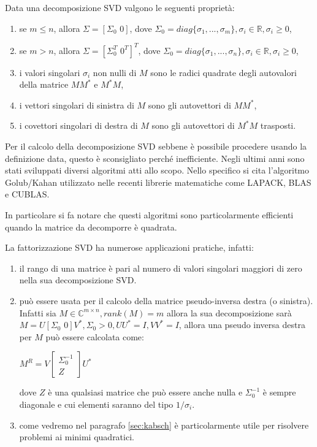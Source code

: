 \begin{prop}
	Data una decomposizione SVD valgono le seguenti proprietà:
	\begin{enumerate}
		\item se $ m \le n$, allora $\Sigma = [\Sigma_0 \, \, 0]$, dove $\Sigma_0 = diag \{\sigma_1, ..., \sigma_m \}, \sigma_i \in \mathbb{R}, \sigma_i \ge 0$,
		\item se $ m > n$, allora $\Sigma = [\Sigma_0^T \, \, 0^T]^T$, dove $\Sigma_0 = diag \{\sigma_1, ..., \sigma_n \}, \sigma_i \in \mathbb{R}, \sigma_i \ge 0$,	 
		\item i valori singolari $\sigma_i$ non nulli di $M$ sono le radici quadrate degli autovalori della matrice $MM^*$ e $M^*M$,
		\item i vettori singolari di sinistra di $M$ sono gli autovettori di $MM^{*}$,
		\item i covettori singolari di destra di $M$ sono gli autovettori di $M^{*}M$ trasposti.
	\end{enumerate}
\end{prop}

Per il calcolo della decomposizione SVD sebbene è possibile procedere usando la definizione data, questo è sconsigliato perché inefficiente. Negli ultimi anni sono stati sviluppati diversi algoritmi atti allo scopo. Nello specifico si cita l'algoritmo Golub/Kahan utilizzato nelle recenti librerie matematiche come LAPACK, BLAS e CUBLAS.

In particolare si fa notare che questi algoritmi sono particolarmente efficienti quando la matrice da decomporre è quadrata.

La fattorizzazione SVD ha numerose applicazioni pratiche, infatti:
\begin{enumerate}
	\item il rango di una matrice è pari al numero di valori singolari maggiori di zero nella sua decomposizione SVD.
	\item può essere usata per il calcolo della matrice pseudo-inversa destra (o sinistra). Infatti sia $M \in \mathbb{C}^{m \times n}, rank(M) = m$ allora la sua decomposizione sarà $M = U [ \Sigma_0 \,\, 0 ] V^*, \Sigma_0 > 0, UU^* = I, VV^* = I$, allora una pseudo inversa destra per $M$ può essere calcolata come:
	\begin{center}
		$M^{R} = V 
		\begin{bmatrix}
			\Sigma_0^{-1} \\
			Z
		\end{bmatrix} U^*$
	\end{center} 
	dove $Z$ è una qualsiasi matrice che può essere anche nulla e $\Sigma_0^{-1}$ è sempre diagonale e cui elementi saranno del tipo $1/\sigma_i$.
	\item come vedremo nel paragrafo \ref{sec:kabsch} è particolarmente utile per risolvere problemi ai minimi quadratici.
\end{enumerate}
